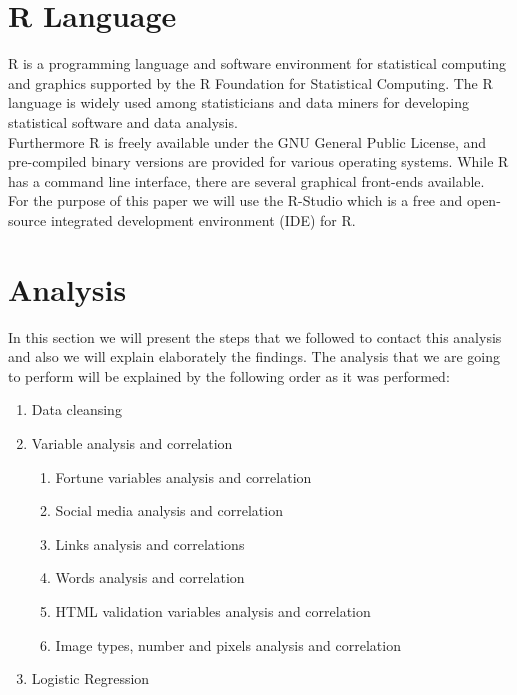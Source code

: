 \documentclass{book}
\begin{document}
\section{R Language}
R is a programming language and software environment for statistical computing and graphics supported by the R Foundation for Statistical Computing. The R language is widely used among statisticians and data miners for developing statistical software and data analysis.\\ 
Furthermore R is freely available under the GNU General Public License, and pre-compiled binary versions are provided for various operating systems. While R has a command line interface, there are several graphical front-ends available.\\
For the purpose of this paper we will use the R-Studio which  is a free and open-source integrated development environment (IDE) for R.
\section{Analysis}
In this section we will present the steps that we followed to contact this analysis and also we will explain elaborately the findings. The analysis that we are going to perform will be explained by the following order as it was performed:
\begin{enumerate}
\item Data cleansing
\item Variable analysis and correlation
\begin{enumerate}
\item Fortune variables analysis and correlation
\item Social media analysis and correlation
\item Links analysis and correlations
\item Words analysis and correlation
\item HTML validation variables analysis and correlation
\item Image types, number and pixels analysis and correlation
\end{enumerate}
\item Logistic Regression
\end{enumerate}
\end{document}
